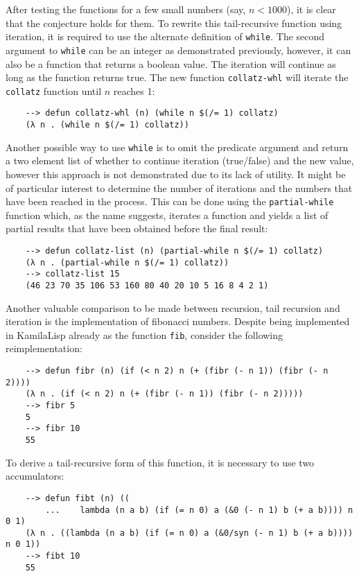 After testing the functions for a few small numbers (say, $n < 1000$), it is clear that the conjecture holds for them. To rewrite this tail-recursive function using iteration, it is required to use the alternate definition of \verb|while|. The second argument to \verb|while| can be an integer as demonstrated previously, however, it can also be a function that returns a boolean value. The iteration will continue as long as the function returns true. The new function \verb|collatz-whl| will iterate the \verb|collatz| function until $n$ reaches 1:

\begin{Verbatim}
    --> defun collatz-whl (n) (while n $(/= 1) collatz)
    (λ n . (while n $(/= 1) collatz))
\end{Verbatim}

Another possible way to use \verb|while| is to omit the predicate argument and return a two element list of whether to continue iteration (true/false) and the new value, however this approach is not demonstrated due to its lack of utility. It might be of particular interest to determine the number of iterations and the numbers that have been reached in the process. This can be done using the \verb|partial-while| function which, as the name suggests, iterates a function and yields a list of partial results that have been obtained before the final result:

\begin{Verbatim}
    --> defun collatz-list (n) (partial-while n $(/= 1) collatz)
    (λ n . (partial-while n $(/= 1) collatz))
    --> collatz-list 15
    (46 23 70 35 106 53 160 80 40 20 10 5 16 8 4 2 1)
\end{Verbatim}

Another valuable comparison to be made between recursion, tail recursion and iteration is the implementation of fibonacci numbers. Despite being implemented in KamilaLisp already as the function \verb|fib|, consider the following reimplementation:

\begin{Verbatim}
    --> defun fibr (n) (if (< n 2) n (+ (fibr (- n 1)) (fibr (- n 2))))
    (λ n . (if (< n 2) n (+ (fibr (- n 1)) (fibr (- n 2)))))
    --> fibr 5
    5
    --> fibr 10
    55
\end{Verbatim}

To derive a tail-recursive form of this function, it is necessary to use two accumulators:

\begin{Verbatim}
    --> defun fibt (n) ((
        ...    lambda (n a b) (if (= n 0) a (&0 (- n 1) b (+ a b)))) n 0 1)
    (λ n . ((lambda (n a b) (if (= n 0) a (&0/syn (- n 1) b (+ a b)))) n 0 1))
    --> fibt 10
    55
\end{Verbatim}

